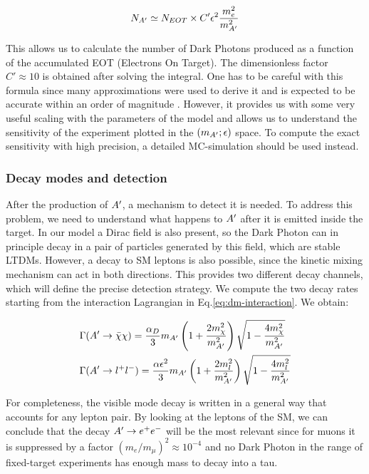 \begin{equation}
  \label{eq:dm-rate}
  N_{A'} \simeq N_{EOT} \times C' \epsilon^2 \frac{m_e^2}{m^2_{A'}}
\end{equation}

This allows us to calculate the number of Dark Photons produced as a function of the accumulated EOT (Electrons On Target). The dimensionless factor $C' \approx 10$ is obtained after solving the integral. One has to be careful with this formula since many approximations were used to derive it and is expected to be accurate within an order of magnitude \cite{jdb}. However, it provides us with some very useful scaling with the parameters of the model and allows us to understand the sensitivity of the experiment plotted in the $(m_{A'};\epsilon)$ space. To compute the exact sensitivity with high precision, a detailed MC-simulation should be used instead.

\subsubsection{Decay modes and detection}
\label{ch1:sec:dm-decay}

After the production of $A'$, a mechanism to detect it is needed. To address this problem, we need to understand what happens to $A'$ after it is emitted inside the target. In our model a Dirac field is also present, so the Dark Photon can in principle decay in a pair of particles generated by this field, which are stable LTDMs. However, a decay to SM leptons is also possible, since the kinetic mixing mechanism can act in both directions. This provides two different decay channels, which will define the precise detection strategy. We compute the two decay rates starting from the interaction Lagrangian in Eq.\ref{eq:dm-interaction}. We obtain:

\begin{equation}
  \label{eq:dm-bratio}
  \begin{aligned}
    &\Gamma(A' \to \bar{\chi} \chi) = \frac{\alpha_D}{3} m_{A'} \left( 1 + \frac{2m^2_{\chi}}{m_{A'}^2}\right) \sqrt{1 - \frac{4m_{\chi}^2}{m^2_{A'}}}\\
    &\Gamma(A' \to l^+l^-) = \frac{\alpha \epsilon^2}{3} m_{A'} \left( 1 + \frac{2m^2_{l}}{m_{A'}^2}\right) \sqrt{1 - \frac{4m_{l}^2}{m^2_{A'}}}
  \end{aligned}
\end{equation}

For completeness, the visible mode decay is written in a general way that accounts for any lepton pair. By looking at the leptons of the SM, we can conclude that the decay $A' \to e^+e^-$ will be the most relevant since for muons it is suppressed by a factor $(m_e/m_{\mu})^2 \approx 10^{-4}$ and no Dark Photon in the range of fixed-target experiments has enough mass to decay into a tau.


